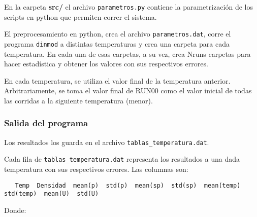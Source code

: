 En la carpeta \textbf{src/} el archivo \texttt{parametros.py} contiene la 
parametrizaci\'on de los scripts en python que permiten correr el sistema.

\begin{comment}
en 
serie (ver \eqref{serie}), 
o en paralelo (ver \eqref{paralelo}).

El preprocesamiento en python, permite definir una zona de c\'alculo de paso
de temperatura fino. Es decir se puede parametrizar un paso de temperatura de
$0.1$ para todo el rango de temperatura y dentro de ese rango definir una zona
donde el paso de temperatura puede ser menor, ej. $\Delta T = 0.02$. Para 
lograr una mejor resoluci\'on
en esa zona.

En particular en este c\'alculo se uso para explorar con m\'as detalle la zona
cr\'itica.

\end{comment}

El preprocesamiento en python, crea el archivo \texttt{parametros.dat}, 
corre el programa \texttt{dinmod} a distintas temperaturas y crea una carpeta para 
 cada temperatura. En cada una de esas carpetas, a su vez, crea Nruns carpetas 
 para hacer estadística y obtener los valores con sus respectivos errores.
 
  En cada temperatura, se utiliza el valor final de la temperatura anterior.
  Arbitrariamente, se toma el valor final de RUN00 como el valor inicial de
  todas las corridas a la siguiente temperatura (menor).
 

\subsubsection{Salida del programa}

Los resultados los guarda en el archivo \texttt{tablas\_temperatura.dat}.

Cada fila de \texttt{tablas\_temperatura.dat} representa los resultados a una 
dada temperatura con sus respectivos errores. Las columnas son:

\begin{verbatim}
   Temp  Densidad  mean(p)  std(p)  mean(sp)  std(sp)  mean(temp)  std(temp)  mean(U)  std(U)
\end{verbatim}

Donde:

